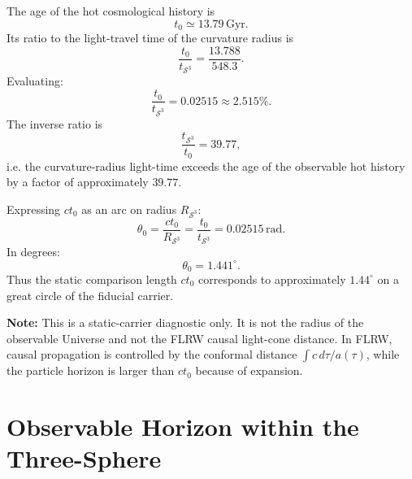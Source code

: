 \documentclass[aps,prd,onecolumn,superscriptaddress,longbibliography,nofootinbib,notitlepage]{revtex4-2}
\newcommand{\Gyr}{\,\mathrm{Gyr}}
\begin{document}
The age of the hot cosmological history is
\begin{equation}
  t_0 \simeq 13.79\Gyr.
\end{equation}
Its ratio to the light-travel time of the curvature radius is
\begin{equation}
  \frac{t_0}{t_{\mathcal{S}^3}}
  = \frac{13.788}{548.3}.
\end{equation}
Evaluating:
\begin{equation}
  \boxed{\frac{t_0}{t_{\mathcal{S}^3}} = 0.02515
  \approx 2.515\%.}
\end{equation}
The inverse ratio is
\begin{equation}
  \boxed{\frac{t_{\mathcal{S}^3}}{t_0} = 39.77,}
\end{equation}
i.e. the curvature-radius light-time exceeds the age of the observable hot
history by a factor of approximately $39.77$.

Expressing $ct_0$ as an arc on radius $R_{\mathcal{S}^3}$:
\begin{equation}
  \theta_0 = \frac{ct_0}{R_{\mathcal{S}^3}}
  = \frac{t_0}{t_{\mathcal{S}^3}}
  = 0.02515\,\mathrm{rad}.
\end{equation}
In degrees:
\begin{equation}
  \boxed{\theta_0 = 1.441^\circ.}
\end{equation}
Thus the static comparison length $ct_0$ corresponds to approximately
$1.44^\circ$ on a great circle of the fiducial carrier.

\textbf{Note:} This is a static-carrier diagnostic only. It is not the radius of
the observable Universe and not the FLRW causal light-cone distance. In FLRW,
causal propagation is controlled by the conformal distance
$\int c\,d\tau/a(\tau)$, while the particle horizon is larger than $ct_0$ because
of expansion.

\section{Observable Horizon within the Three-Sphere}
\label{sec:horizon}
\end{document}
